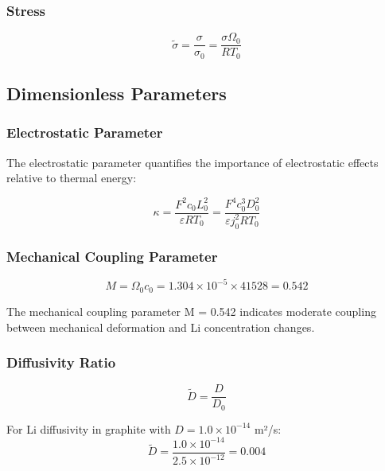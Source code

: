 \documentclass[11pt,a4paper]{article}
\newcommand{\tildevar}[1]{\tilde{#1}}
\begin{document}
\subsubsection{Stress}
\begin{equation}
\tildevar{\sigma} = \frac{\sigma}{\sigma_0} = \frac{\sigma \Omega_0}{RT_0}
\end{equation}

\subsection{Dimensionless Parameters}

\subsubsection{Electrostatic Parameter}

The electrostatic parameter quantifies the importance of electrostatic effects relative to thermal energy:

\begin{equation}
\kappa = \frac{F^2 c_0 L_0^2}{\varepsilon RT_0} = \frac{F^4 c_0^3 D_0^2}{\varepsilon j_0^2 RT_0}
\label{eq:kappa}
\end{equation}

\subsubsection{Mechanical Coupling Parameter}

\begin{equation}
M = \Omega_0 c_0 = 1.304 \times 10^{-5} \times 41528 = 0.542
\label{eq:M_mech}
\end{equation}

The mechanical coupling parameter M = 0.542 indicates moderate coupling between mechanical deformation and Li concentration changes.

\subsubsection{Diffusivity Ratio}

\begin{equation}
\tildevar{D} = \frac{D}{D_0}
\label{eq:D_tilde}
\end{equation}

For Li diffusivity in graphite with $D = 1.0 \times 10^{-14}$ m²/s:
\begin{equation}
\tildevar{D} = \frac{1.0 \times 10^{-14}}{2.5 \times 10^{-12}} = 0.004
\end{equation}
\end{document}
